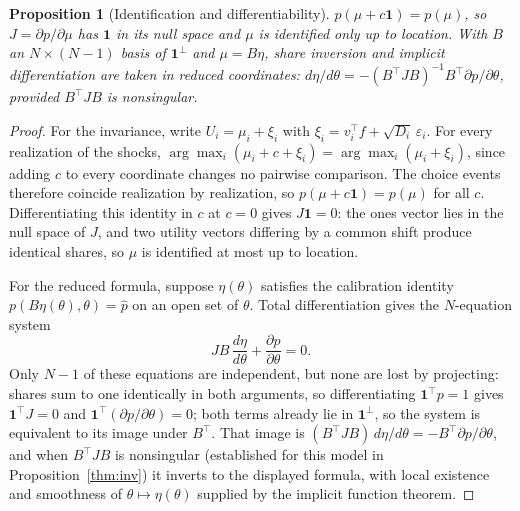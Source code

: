 \documentclass[12pt]{article}
\newtheorem{proposition}{Proposition}
\theoremstyle{remark}
\begin{document}
\begin{proposition}[Identification and differentiability]\label{prop:ident}
$p(\mu + c\mathbf{1}) = p(\mu)$, so $J = \partial p/\partial \mu$ has
$\mathbf{1}$ in its null space and $\mu$ is identified only up to location.
With $B$ an $N \times (N-1)$ basis of $\mathbf{1}^\perp$ and $\mu = B\eta$,
share inversion and implicit differentiation are taken in reduced coordinates:
$d\eta/d\theta = -(B^\top J B)^{-1} B^\top \partial p/\partial\theta$,
provided $B^\top J B$ is nonsingular.
\end{proposition}
\begin{proof}
For the invariance, write $U_i = \mu_i + \xi_i$ with $\xi_i = v_i^\top f
+ \sqrt{D_i}\,\varepsilon_i$. For every realization of the shocks,
$\arg\max_i (\mu_i + c + \xi_i) = \arg\max_i (\mu_i + \xi_i)$, since
adding $c$ to every coordinate changes no pairwise comparison. The choice
events therefore coincide realization by realization, so $p(\mu +
c\mathbf{1}) = p(\mu)$ for all $c$. Differentiating this identity in $c$
at $c = 0$ gives $J\mathbf{1} = 0$: the ones vector lies in the null space
of $J$, and two utility vectors differing by a common shift produce
identical shares, so $\mu$ is identified at most up to location.

For the reduced formula, suppose $\eta(\theta)$ satisfies the calibration
identity $p(B\eta(\theta), \theta) = \hat p$ on an open set of
$\theta$. Total differentiation gives the $N$-equation system
\[
J B \,\frac{d\eta}{d\theta} + \frac{\partial p}{\partial \theta}
= 0 .
\]
Only $N - 1$ of these equations are independent, but none are lost by
projecting: shares sum to one identically in both arguments, so
differentiating $\mathbf{1}^\top p = 1$ gives $\mathbf{1}^\top J = 0$
and $\mathbf{1}^\top (\partial p / \partial \theta) = 0$; both terms
already lie in $\mathbf{1}^\perp$, so the system is equivalent to its
image under $B^\top$. That image is $(B^\top J B)\, d\eta/d\theta =
-B^\top \partial p/\partial\theta$, and when $B^\top J B$ is
nonsingular (established for this model in Proposition~\ref{thm:inv}) it
inverts to the displayed formula, with local existence and smoothness of
$\theta \mapsto \eta(\theta)$ supplied by the implicit function theorem.
\end{proof}
\end{document}
